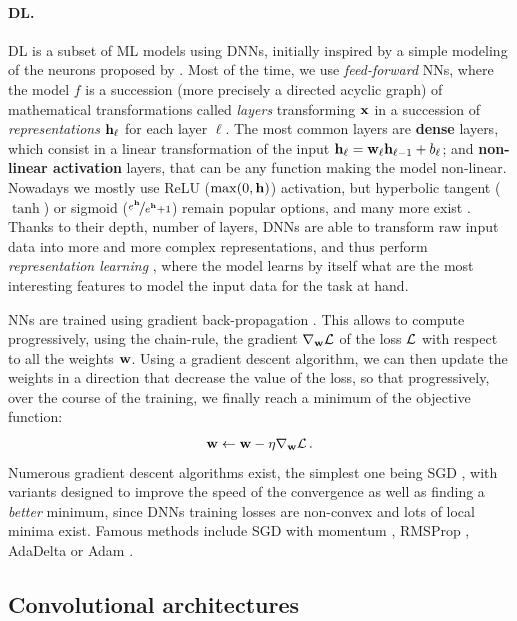 \paragraph{\acf{DL}.} \ac{DL} is a subset of \ac{ML} models using \acfp{DNN}, initially inspired by a simple modeling of the neurons proposed by \citet{mcculloch1943logical}. Most of the time, we use \textit{feed-forward} \acfp{NN}, where the model $f$ is a succession (more precisely a directed acyclic graph) of mathematical transformations called \textit{layers} transforming $\mathbf{x}$ in a succession of \textit{representations} $\mathbf{h}_\ell$ for each layer $\ell$. The most common layers are \textbf{dense} layers, which consist in a linear transformation of the input $\mathbf{h}_{\ell} = \mathbf{w}_\ell \mathbf{h}_{\ell-1} + b_\ell$; and \textbf{non-linear activation} layers, that can be any function making the model non-linear. Nowadays we mostly use \ac{ReLU} ($\max (0, \mathbf{h})$) activation, but hyperbolic tangent ($\tanh$) or sigmoid ($\nicefrac{e^{\mathbf{h}}}{e^{\mathbf{h}} + 1}$) remain popular options, and many more exist \citep{nwankpa2018activation}. Thanks to their depth, \ie number of layers, \acp{DNN} are able to transform raw input data into more and more complex representations, and thus perform \textit{representation learning} \citep{bengio2013representation}, where the model learns by itself what are the most interesting features to model the input data for the task at hand.

\acfp{NN} are trained using gradient back-propagation \citep{rumelhart1988learning}. This allows to compute progressively, using the chain-rule, the gradient $\nabla_{\mathbf{w}} \mathcal{L}$ of the loss $\mathcal{L}$ with respect to all the weights $\mathbf{w}$. Using a gradient descent algorithm, we can then update the weights in a direction that decrease the value of the loss, so that progressively, over the course of the training, we finally reach a minimum of the objective function:
\begin{equation}
	\mathbf{w} \leftarrow \mathbf{w} - \eta \nabla_{\mathbf{w}} \mathcal{L} \,.
\end{equation}
Numerous gradient descent algorithms exist, the simplest one being \acf{SGD} \citep{sgd}, with variants designed to improve the speed of the convergence as well as finding a \textit{better} minimum, since \acp{DNN} training losses are non-convex and lots of local minima exist. Famous methods include \ac{SGD} with momentum \citep{rumelhart1988learning}, RMSProp \citep{hinton2012neural}, AdaDelta \citep{duchi2011adaptive} or Adam \citep{adam}.

\subsection{Convolutional architectures}

